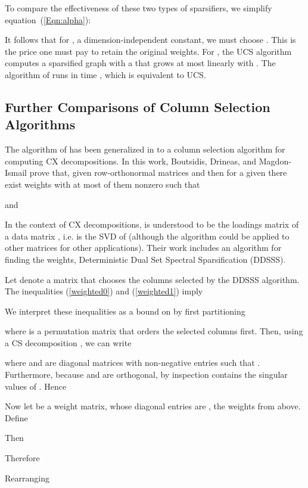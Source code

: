 \documentclass[final,leqno,onefignum,onetabnum]{siamltex1213}
\begin{document}
To compare the effectiveness of these two types of sparsifiers, we 
simplify equation~(\ref{Eqn:alpha}):

It follows that for , a
dimension-independent constant, we must choose . This
is the price one must pay to retain the original weights. For , the UCS algorithm computes a sparsified graph with
a  that grows at most linearly with .  The algorithm of \cite{ramanujansparse} runs in time , which is equivalent to UCS.

\subsection{Further Comparisons of Column Selection Algorithms}
The algorithm of \cite{ramanujansparse} has been generalized in \cite{nearoptcol} to a column selection algorithm for computing CX decompositions.  In this work, Boutsidis, Drineas, and Magdon-Ismail prove that, given row-orthonormal matrices  and  then for a given  there exist weights  with at most  of them nonzero such that

 and
 
In the context of CX decompositions,  is understood to be the loadings matrix of a data matrix , i.e.  is the SVD of  (although the algorithm could be applied to other matrices for other applications).  Their work includes an algorithm for finding the weights, Deterministic Dual Set Spectral Sparsification (DDSSS).

\begin{theorem}\label{bnd:old}
Let  denote a matrix that chooses the  columns selected by the DDSSS algorithm.  The inequalities (\ref{weighted0}) and (\ref{weighted1}) imply

\end{theorem}
\proof
We interpret these inequalities as a bound on  by first partitioning

where  is a permutation matrix that orders the selected columns first. Then, using a CS decomposition \cite{loan}, we can write

where  and  are diagonal matrices with non-negative entries such that .  Furthermore, because  and  are orthogonal, by inspection  contains the singular values of .  Hence

Now let  be a weight matrix, whose diagonal entries are , the weights from above.  Define

Then
\footnotesize

\normalsize
Therefore


Rearranging
\end{document}
